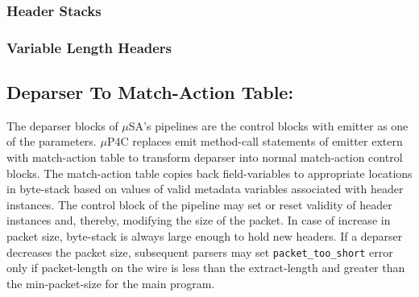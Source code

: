 
\subsubsection*{Header Stacks}

\subsubsection*{Variable Length Headers}

\subsection{Deparser To Match-Action Table:}
\label{subsection:deparser-to-match-action-table}
The deparser blocks of $\mu$SA's pipelines are the control blocks with emitter as one of the parameters.
$\mu$P4C replaces emit method-call statements of emitter extern with match-action table to transform deparser into normal match-action control blocks.
The match-action table copies back field-variables to appropriate locations in byte-stack based on values of valid metadata variables associated with header instances. 
The control block of the pipeline may set or reset validity of header instances and, thereby, modifying the size of the packet.
In case of increase in packet size, byte-stack is always large enough to hold new headers.
If a deparser decreases the packet size, subsequent parsers may set \texttt{packet\_too\_short} error only if 
packet-length on the wire is less than the extract-length and greater than the min-packet-size for the main program.

